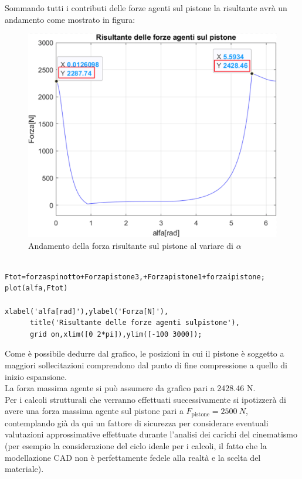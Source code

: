 Sommando tutti i contributi delle forze agenti sul pistone la risultante avrà un andamento come mostrato in figura:
\begin{figure}[h]
    \centering
    \includegraphics[scale=0.3]{Immagini/GraficoForzaRisultante.png}
    \caption{Andamento della forza risultante sul pistone al variare di $\alpha$}
    \label{fig:GraficoForzaRisultante}
\end{figure}
\begin{lstlisting}[frame=trBL]
%Grafico andamento forza totale

Ftot=forzaspinotto+Forzapistone3,+Forzapistone1+forzaipistone;
plot(alfa,Ftot)

xlabel('alfa[rad]'),ylabel('Forza[N]'),
      title('Risultante delle forze agenti sulpistone'),
      grid on,xlim([0 2*pi]),ylim([-100 3000]);
\end{lstlisting}
Come è possibile dedurre dal grafico, le posizioni in cui il pistone è soggetto a maggiori sollecitazioni comprendono dal punto di fine compressione a quello di inizio espansione.\\
La forza massima agente si può assumere da grafico pari a 2428.46 N.\\
Per i calcoli strutturali che verranno effettuati successivamente si ipotizzerà di avere una forza massima agente sul pistone pari a $F_{\mbox{pistone}} = 2500\ N$, contemplando già da qui un fattore di sicurezza per considerare eventuali valutazioni approssimative effettuate durante l’analisi dei carichi del cinematismo (per esempio la considerazione del ciclo ideale per i calcoli, il fatto che la modellazione CAD non è perfettamente fedele alla realtà e la scelta del materiale). 
